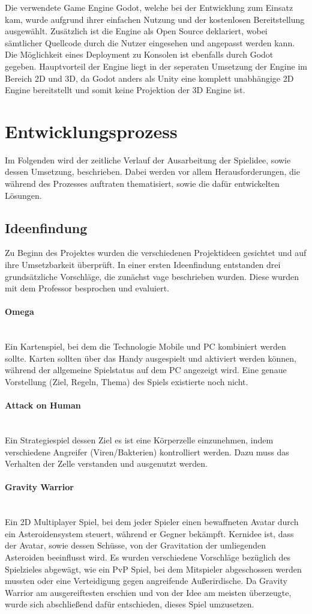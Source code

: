 \documentclass[11pt]{scrartcl}
\newcommand{\lbparagraph}[1]{\paragraph*{#1}\mbox{}\\}
\begin{document}
Die verwendete Game Engine Godot, welche bei der Entwicklung zum Einsatz kam, wurde aufgrund ihrer einfachen Nutzung und der kostenlosen Bereitstellung ausgewählt. Zusätzlich ist die Engine als Open Source deklariert, wobei sämtlicher Quellcode durch die Nutzer eingesehen und angepasst werden kann. Die Möglichkeit eines Deployment zu Konsolen ist ebenfalls durch Godot gegeben. Hauptvorteil der Engine liegt in der seperaten Umsetzung der Engine im Bereich 2D und 3D, da Godot anders als Unity eine komplett unabhängige 2D Engine bereitstellt und somit keine Projektion der 3D Engine ist\cite{G2019}.

\newpage
\section{Entwicklungsprozess}
Im Folgenden wird der zeitliche Verlauf der Ausarbeitung der Spielidee, sowie dessen Umsetzung, beschrieben. Dabei werden vor allem Herausforderungen, die während des Prozesses auftraten thematisiert, sowie die dafür entwickelten Lösungen.
\subsection{Ideenfindung}
Zu Beginn des Projektes wurden die verschiedenen Projektideen gesichtet und auf ihre Umsetzbarkeit überprüft. In einer ersten Ideenfindung entstanden drei grundsätzliche Vorschläge, die zunächst vage beschrieben wurden.
Diese wurden mit dem Professor besprochen und evaluiert.

\lbparagraph{Omega}
Ein Kartenspiel, bei dem die Technologie Mobile und PC kombiniert werden sollte. Karten sollten über das Handy ausgespielt und aktiviert werden können, während der allgemeine Spielstatus auf dem PC angezeigt wird. Eine genaue Vorstellung (Ziel, Regeln, Thema) des Spiels existierte noch nicht.
\lbparagraph{Attack on Human}
Ein Strategiespiel dessen Ziel es ist eine Körperzelle einzunehmen, indem verschiedene Angreifer (Viren/Bakterien) kontrolliert werden. Dazu muss das Verhalten der Zelle verstanden und ausgenutzt werden.

\lbparagraph{Gravity Warrior}
Ein 2D Multiplayer Spiel, bei dem jeder Spieler einen bewaffneten Avatar durch ein Asteroidensystem steuert, während er Gegner bekämpft. Kernidee ist, dass der Avatar, sowie dessen Schüsse, von der Gravitation der umliegenden Asteroiden beeinflusst wird.
Es wurden verschiedene Vorschläge bezüglich des Spielzieles abgewägt, wie ein PvP Spiel, bei dem Mitspieler abgeschossen werden mussten oder eine Verteidigung gegen angreifende Außerirdische. Da Gravity Warrior am ausgereiftesten erschien und von der Idee am meisten überzeugte, wurde sich abschließend dafür entschieden, dieses Spiel umzusetzen.
\end{document}
